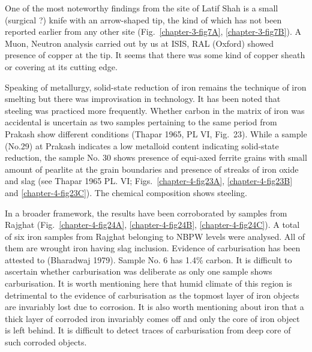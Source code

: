One of the most noteworthy findings from the site of Latif Shah is a small (surgical ?) knife with an arrow-shaped tip, the kind of which has not been reported earlier from any other site (Fig.~\ref{chapter-3-fig7A}, \ref{chapter-3-fig7B}). A Muon, Neutron analysis carried out by us at ISIS, RAL (Oxford) showed presence of copper at the tip. It seems that there was some kind of copper sheath or covering at its cutting edge. 

Speaking of metallurgy, solid-state reduction of iron remains the technique of iron smelting but there was improvisation in technology. It has been noted that steeling was practiced more frequently. Whether carbon in the matrix of iron was accidental is uncertain as two samples pertaining to the same period from Prakash show different conditions (Thapar 1965, PL VI, Fig.~23). While a sample (No.29) at Prakash indicates a low metalloid content indicating solid-state reduction, the sample No. 30 shows presence of equi-axed ferrite grains with small amount of pearlite at the grain boundaries and presence of streaks of iron oxide and slag (see Thapar 1965 PL. VI; Figs.~\ref{chapter-4-fig23A}, \ref{chapter-4-fig23B} and \ref{chapter-4-fig23C}). The chemical composition shows steeling.

In a broader framework, the results have been corroborated by samples from Rajghat (Fig.~\ref{chapter-4-fig24A}, \ref{chapter-4-fig24B}, \ref{chapter-4-fig24C}). A total of six iron samples from Rajghat belonging to NBPW levels were analysed. All of them are wrought iron having slag inclusion. Evidence of carburisation has been attested to (Bharadwaj 1979). Sample No. 6 has 1.4\% carbon. It is difficult to ascertain whether carburisation was deliberate as only one sample shows carburisation. It is worth mentioning here that humid climate of this region is detrimental to the evidence of carburisation as the topmost layer of iron objects are invariably lost due to corrosion. It is also worth mentioning about iron that a thick layer of corroded iron invariably comes off and only the core of iron object is left behind. It is difficult to detect traces of carburisation from deep core of such corroded objects.

